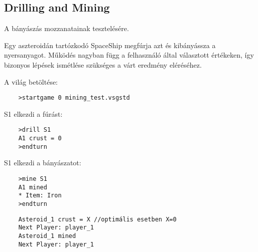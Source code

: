 \documentclass[../../projlab]{subfiles}
\begin{document}
\subsection{Drilling and Mining}
\begin{test-case-description}
    A bányászás mozzanatainak tesztelésére.
\end{test-case-description}
\begin{test-case-function}
    Egy aszteroidán tartózkodó SpaceShip megfúrja azt és kibányássza a nyersanyagot. \newline
    Működés nagyban függ a felhasználó által választott értékeken, így bizonyos lépések ismétlése szükséges a várt eredmény eléréséhez.
\end{test-case-function}
\begin{test-case-input}

    A világ betöltése: 
    \begin{verbatim}
    >startgame 0 mining_test.vsgstd
    \end{verbatim}
    S1 elkezdi a fúrást: 
    \begin{verbatim}
    >drill S1
    A1 crust = 0
    >endturn
    \end{verbatim}
    S1 elkezdi a bányászatot: 
    \begin{verbatim}
    >mine S1
    A1 mined
    * Item: Iron
    >endturn
    \end{verbatim}
\end{test-case-input}
\begin{test-case-output}
\begin{verbatim}
    Asteroid_1 crust = X //optimális esetben X=0
    Next Player: player_1
    Asteroid_1 mined
    Next Player: player_1
\end{verbatim}
\end{test-case-output}
\end{document}
